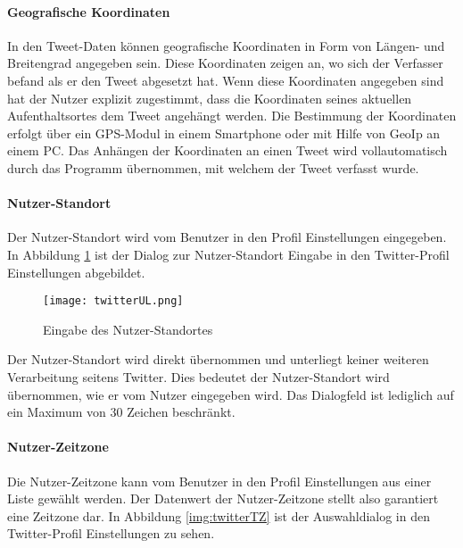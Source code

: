 			\paragraph{Geografische Koordinaten}
				
				In den Tweet-Daten können geografische Koordinaten in Form von Längen- und Breitengrad angegeben sein. 
				Diese Koordinaten zeigen an, wo sich der Verfasser befand als er den Tweet abgesetzt hat.
				Wenn diese Koordinaten angegeben sind hat der Nutzer explizit zugestimmt, dass die Koordinaten seines aktuellen Aufenthaltsortes dem Tweet angehängt werden. 
				Die Bestimmung der Koordinaten erfolgt über ein GPS-Modul in einem Smartphone oder mit Hilfe von GeoIp an einem PC.
				Das Anhängen der Koordinaten an einen Tweet wird vollautomatisch durch das Programm übernommen, mit welchem der Tweet verfasst wurde.

			\paragraph{Nutzer-Standort} 
				
				Der Nutzer-Standort wird vom Benutzer in den Profil Einstellungen eingegeben.
				In Abbildung \ref{img:twitterLocation} ist der Dialog zur Nutzer-Standort Eingabe in den Twitter-Profil Einstellungen abgebildet.


				\begin{figure}[!ht]
						\begin{center}
							\texttt{[image: twitterUL.png]}
							\caption{Eingabe des Nutzer-Standortes}
							\label{img:twitterLocation}
						\end{center}
					\end{figure}	

				Der Nutzer-Standort wird direkt übernommen und unterliegt keiner weiteren Verarbeitung seitens Twitter.
				Dies bedeutet der Nutzer-Standort wird übernommen, wie er vom Nutzer eingegeben wird.
				Das Dialogfeld ist lediglich auf ein Maximum von 30 Zeichen beschränkt. 

			\paragraph{Nutzer-Zeitzone} 

				Die Nutzer-Zeitzone kann vom Benutzer in den Profil Einstellungen aus einer Liste gewählt werden.
				Der Datenwert der Nutzer-Zeitzone stellt also garantiert eine Zeitzone dar. 
				In Abbildung \ref{img:twitterTZ} ist der Auswahldialog in den Twitter-Profil Einstellungen zu sehen.

